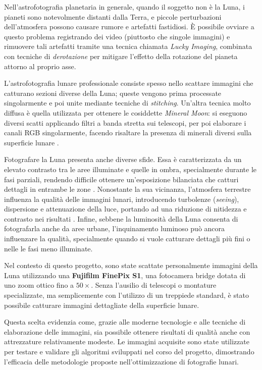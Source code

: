 Nell'astrofotografia planetaria in generale, quando il soggetto non è la Luna, i pianeti sono notevolmente distanti dalla Terra, e piccole perturbazioni dell'atmosfera possono causare rumore e artefatti fastidiosi. È possibile ovviare a questo problema registrando dei video (piuttosto che singole immagini) e rimuovere tali artefatti tramite una tecnica chiamata \textit{Lucky Imaging}, combinata con tecniche di \textit{derotazione} per mitigare l'effetto della rotazione del pianeta attorno al proprio asse.

L'astrofotografia lunare professionale consiste spesso nello scattare immagini che catturano sezioni diverse della Luna; queste vengono prima processate singolarmente e poi unite mediante tecniche di \textit{stitching}. Un'altra tecnica molto diffusa è quella utilizzata per ottenere le cosiddette \textit{Mineral Moon}: si eseguono diversi scatti applicando filtri a banda stretta sui telescopi, per poi elaborare i canali RGB singolarmente, facendo risaltare la presenza di minerali diversi sulla superficie lunare \cite{legault_astrophoto}.

Fotografare la Luna presenta anche diverse sfide. Essa è caratterizzata da un elevato contrasto tra le aree illuminate e quelle in ombra, specialmente durante le fasi parziali, rendendo difficile ottenere un'esposizione bilanciata che catturi dettagli in entrambe le zone \cite{sheehan_epic_moon}. Nonostante la sua vicinanza, l'atmosfera terrestre influenza la qualità delle immagini lunari, introducendo turbolenze (\textit{seeing}), dispersione e attenuazione della luce, portando ad una riduzione di nitidezza e contrasto nei risultati \cite{sheehan_epic_moon}. Infine, sebbene la luminosità della Luna consenta di fotografarla anche da aree urbane, l'inquinamento luminoso può ancora influenzare la qualità, specialmente quando si vuole catturare dettagli più fini o nelle le fasi meno illuminate.

Nel contesto di questo progetto, sono state scattate personalmente immagini della Luna utilizzando una \textbf{Fujifilm FinePix S1}, una fotocamera bridge dotata di uno zoom ottico fino a $50 \times$. Senza l'ausilio di telescopi o montature specializzate, ma semplicemente con l'utilizzo di un treppiede standard, è stato possibile catturare immagini dettagliate della superficie lunare.

Questa scelta evidenzia come, grazie alle moderne tecnologie e alle tecniche di elaborazione delle immagini, sia possibile ottenere risultati di qualità anche con attrezzature relativamente modeste. Le immagini acquisite sono state utilizzate per testare e validare gli algoritmi sviluppati nel corso del progetto, dimostrando l'efficacia delle metodologie proposte nell'ottimizzazione di fotografie lunari.
\cleardoublepage